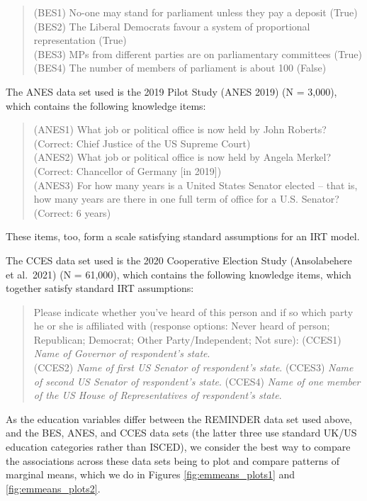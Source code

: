 \documentclass[11pt,halfline,a4paper,]{ouparticle}
\begin{document}
\begin{quote}
(BES1) No-one may stand for parliament unless they pay a deposit
(True)\\
(BES2) The Liberal Democrats favour a system of proportional
representation (True)\\
(BES3) MPs from different parties are on parliamentary committees
(True)\\
(BES4) The number of members of parliament is about 100 (False)
\end{quote}

The ANES data set used is the 2019 Pilot Study (ANES 2019) (N = 3,000),
which contains the following knowledge items:

\begin{quote}
(ANES1) What job or political office is now held by John Roberts?
(Correct: Chief Justice of the US Supreme Court)\\
(ANES2) What job or political office is now held by Angela Merkel?
(Correct: Chancellor of Germany {[}in 2019{]})\\
(ANES3) For how many years is a United States Senator elected -- that
is, how many years are there in one full term of office for a U.S.
Senator? (Correct: 6 years)
\end{quote}

These items, too, form a scale satisfying standard assumptions for an
IRT model.

The CCES data set used is the 2020 Cooperative Election Study
(Ansolabehere et al.~2021) (N = 61,000), which contains the following
knowledge items, which together satisfy standard IRT assumptions:

\begin{quote}
Please indicate whether you've heard of this person and if so which
party he or she is affiliated with (response options: Never heard of
person; Republican; Democrat; Other Party/Independent; Not sure):
(CCES1) \emph{Name of Governor of respondent's state}.\\
(CCES2) \emph{Name of first US Senator of respondent's state}. (CCES3)
\emph{Name of second US Senator of respondent's state}. (CCES4)
\emph{Name of one member of the US House of Representatives of
respondent's state}.
\end{quote}

As the education variables differ between the REMINDER data set used
above, and the BES, ANES, and CCES data sets (the latter three use
standard UK/US education categories rather than ISCED), we consider the
best way to compare the associations across these data sets being to
plot and compare patterns of marginal means, which we do in Figures
\ref{fig:emmeans_plots1} and \ref{fig:emmeans_plots2}.
\end{document}
